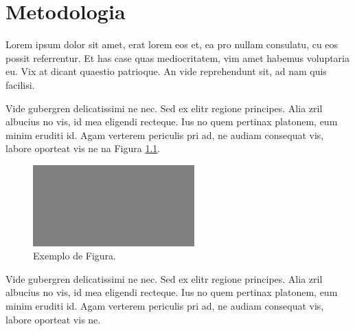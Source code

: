 \chapter{Metodologia}
\label{chap:metodologia}

	Lorem ipsum dolor sit amet, erat lorem eos et, ea pro nullam consulatu, cu eos possit referrentur. Et has case quas mediocritatem, vim amet habemus voluptaria eu. Vix at dicant quaestio patrioque. An vide reprehendunt sit, ad nam quis facilisi.

	

	Vide gubergren delicatissimi ne nec. Sed ex elitr regione principes. Alia zril albucius no vis, id mea eligendi recteque. Ius no quem pertinax platonem, eum minim eruditi id. Agam verterem periculis pri ad, ne audiam consequat vis, labore oporteat vis ne na Figura \ref{fig:metodologia}.

	\begin{figure}[ht]
		\centering
		\includegraphics[width=0.555\textwidth]{figuras/fig2.png}
		\setlength{\abovecaptionskip}{10pt}
		\caption{Exemplo de Figura.}
		\label{fig:metodologia}
	\end{figure}


	Vide gubergren delicatissimi ne nec. Sed ex elitr regione principes. Alia zril albucius no vis, id mea eligendi recteque. Ius no quem pertinax platonem, eum minim eruditi id. Agam verterem periculis pri ad, ne audiam consequat vis, labore oporteat vis ne.\linebreak[2] \newline

